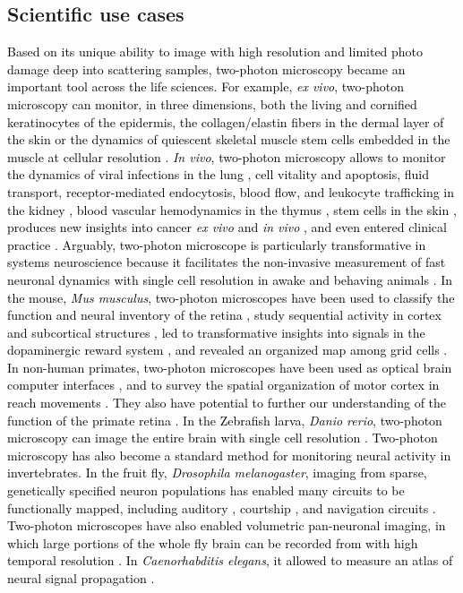 \documentclass[10pt,letterpaper]{article}
\begin{document}
\subsection*{Scientific use cases}
\textcolor{black}{Based on its unique ability to image with high resolution and limited photo damage deep into scattering samples, two-photon microscopy became an important tool across the life sciences. For example, \textit{ex vivo}, two-photon microscopy can monitor, in three dimensions, both the living and cornified keratinocytes of the epidermis, the collagen/elastin fibers in the dermal layer of the skin \cite{So1998} or the dynamics of quiescent skeletal muscle stem cells embedded in the muscle at cellular resolution \cite{Ma2024}. \textit{In vivo}, two-photon microscopy allows to monitor the dynamics of viral infections in the lung \cite{Ueki2020}, cell vitality and apoptosis, fluid transport, receptor-mediated endocytosis, blood flow, and leukocyte trafficking in the kidney \cite{Dunn2002}, 
blood vascular hemodynamics in the thymus \cite{Seyedhassantehrani2024}, stem cells in the skin \cite{Huang2017}, produces new insights into cancer \textit{ex vivo} and \textit{in vivo} \cite{Perry2012}, and even entered clinical practice \cite{Konig2007}.\newline
Arguably, two-photon microscope is particularly transformative in systems neuroscience because it facilitates the non-invasive measurement of fast neuronal dynamics with single cell resolution in awake and behaving animals \cite{Luu2024, Grienberger2022}. In the mouse, \textit{Mus musculus}, two-photon microscopes have been used to classify the function and neural inventory of the retina \cite{Baden2016}, study sequential activity in cortex \cite{Harvey2012} and subcortical structures \cite{Nieh2021}, led to transformative insights into signals in the dopaminergic reward system \cite{Engelhard2019}, and revealed an organized map among grid cells \cite{Yu2018}. In non-human primates, two-photon microscopes have been used as optical brain computer interfaces \cite{Trautmann2021}, and to survey the spatial organization of motor cortex in reach movements \cite{Ebina2018}. They also have potential to further our understanding of the function of the primate retina \cite{Sharma2016, Schottdorf2021}. In the Zebrafish larva, \textit{Danio rerio}, two-photon microscopy can image the entire brain with single cell resolution \cite{Renninger2013}. Two-photon microscopy has also become a standard method for monitoring neural activity in invertebrates. In the fruit fly, \textit{Drosophila melanogaster}, imaging from sparse, genetically specified neuron populations \cite{Seelig2010, Lin2022} has enabled many circuits to be functionally mapped, including auditory \cite{Baker2022}, courtship \cite{Deutsch2020, Roemschied2023}, and navigation circuits \cite{Kim2017}. Two-photon microscopes have also enabled volumetric pan-neuronal imaging, in which large portions of the whole fly brain can be recorded from with high temporal resolution \cite{Pacheco2021,Brezovec2024}. In \textit{Caenorhabditis elegans}, it allowed to measure an atlas of neural signal propagation \cite{Randi2023}.\newline
}
\end{document}
